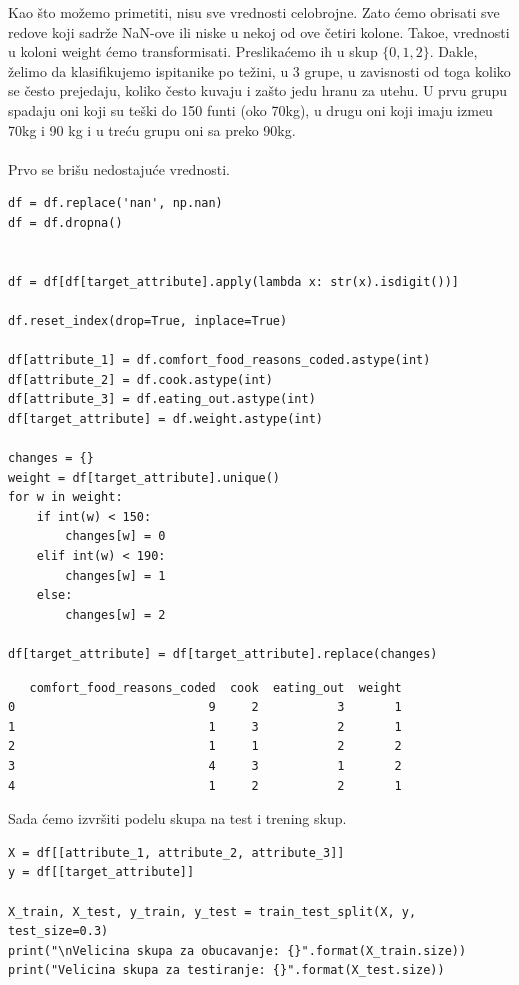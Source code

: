 \documentclass[12pt,a4paper]{article}
\begin{document}
Kao \v sto mo\v zemo primetiti, nisu sve vrednosti celobrojne. Zato \' cemo obrisati sve redove koji sadr\v ze NaN-ove ili niske u nekoj od ove \v cetiri kolone. Tako\dj e, vrednosti u koloni weight \' cemo transformisati. Preslika\' cemo ih u skup $\{0, 1, 2\}$. Dakle, \v zelimo da klasifikujemo ispitanike po te\v zini, u 3 grupe, u zavisnosti od toga koliko se \v cesto prejedaju, koliko \v cesto kuvaju i za\v sto jedu hranu za utehu. U prvu grupu spadaju oni koji su te\v ski do 150 funti (oko 70kg), u drugu oni koji imaju izme\dj u 70kg i 90 kg i u tre\' cu grupu oni sa preko 90kg.
\\ \\
Prvo se bri\v su nedostaju\' ce vrednosti.

\begin{lstlisting}[mathescape=true]
df = df.replace('nan', np.nan)
df = df.dropna()


df = df[df[target_attribute].apply(lambda x: str(x).isdigit())]

df.reset_index(drop=True, inplace=True)

df[attribute_1] = df.comfort_food_reasons_coded.astype(int)
df[attribute_2] = df.cook.astype(int)
df[attribute_3] = df.eating_out.astype(int)
df[target_attribute] = df.weight.astype(int)

changes = {}
weight = df[target_attribute].unique()
for w in weight:
    if int(w) < 150:
        changes[w] = 0
    elif int(w) < 190:
        changes[w] = 1
    else:
        changes[w] = 2

df[target_attribute] = df[target_attribute].replace(changes)
\end{lstlisting}

\begin{verbatim}
   comfort_food_reasons_coded  cook  eating_out  weight
0                           9     2           3       1
1                           1     3           2       1
2                           1     1           2       2
3                           4     3           1       2
4                           1     2           2       1
\end{verbatim}

Sada \' cemo izvr\v siti podelu skupa na test i trening skup.

\begin{lstlisting}
X = df[[attribute_1, attribute_2, attribute_3]]
y = df[[target_attribute]]

X_train, X_test, y_train, y_test = train_test_split(X, y, test_size=0.3)
print("\nVelicina skupa za obucavanje: {}".format(X_train.size))
print("Velicina skupa za testiranje: {}".format(X_test.size))
\end{lstlisting}
\end{document}
